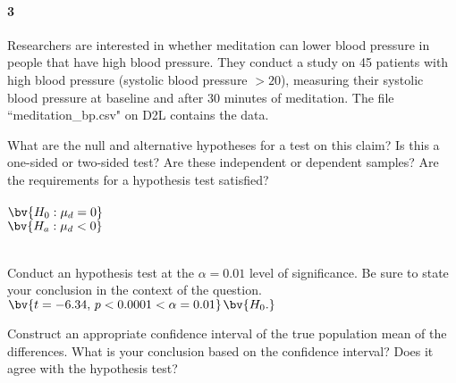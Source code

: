 \documentclass{article}
\begin{document}
\begin{flushleft}
\newpage
\paragraph{3} Researchers are interested in whether meditation can lower blood pressure in people that have high blood pressure. They conduct a study on 45 patients with high blood pressure (systolic blood pressure $> 20$), measuring their systolic blood pressure at baseline and after 30 minutes of meditation. The file ``meditation\_bp.csv" on D2L contains the data.
\begin{enumalpha}
\item What are the null and alternative hypotheses for a test on this claim? Is this a one-sided or two-sided test? Are these independent or dependent samples? Are the requirements for a hypothesis test satisfied?\\
\medskip
{}\\
$\bv{H_0: \mu_d = 0}$ \\
$\bv{H_a: \mu_d < 0}$ \\
\\
\vspace{.5in}\item Conduct an hypothesis test at the $\alpha = 0.01$ level of significance. Be sure to state your conclusion in the context of the question.\\
\medskip
$\bv{t = -6.34, \, p < 0.0001 < \alpha =0.01}$$\bv{H_0.}$\\
\vspace{.5in}
\item Construct an appropriate confidence interval of the true population mean of the differences. What is your conclusion based on the confidence interval? Does it agree with the hypothesis test?\\
\medskip
{}\\
\end{enumalpha}



\end{flushleft}
\end{document}
